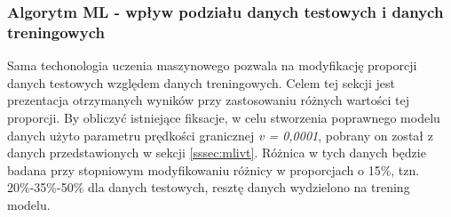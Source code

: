 \subsubsection{Algorytm ML - wpływ podziału danych testowych i danych treningowych}
\label{sssec:mldivide}
Sama techonologia uczenia maszynowego pozwala na modyfikację proporcji danych testowych względem danych treningowych. Celem tej sekcji jest prezentacja otrzymanych wyników przy zastosowaniu różnych wartości tej proporcji. By obliczyć istniejące fiksacje, w celu stworzenia poprawnego modelu danych użyto parametru prędkości granicznej \emph{v = 0,0001}, pobrany on został z danych przedstawionych w sekcji \ref{sssec:mlivt}. Różnica w tych danych będzie badana przy stopniowym modyfikowaniu różnicy w proporcjach o 15\%, tzn. 20\%-35\%-50\% dla danych testowych, resztę danych wydzielono na trening modelu.\par

